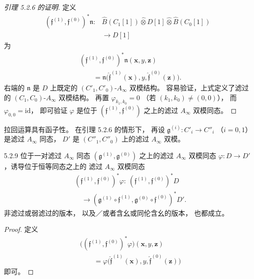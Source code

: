\begin{proof}[引理 5.2.6 的证明]
定义
\[
\begin{aligned}
(\mathfrak f^{(1)},\mathfrak f^{(0)})^*\mathfrak n:
&\widehat B(C_1[1])\widehat\otimes D[1]
 \widehat\otimes\widehat B(C_0[1])\\
&\longrightarrow D[1]
\end{aligned}
\]
为
\[
\begin{aligned}
&(\mathfrak f^{(1)},\mathfrak f^{(0)})^*
\mathfrak n(\mathbf x,y,\mathbf z)\\
&\qquad=
\mathfrak n\bigl(
\widehat{\mathfrak f}^{(1)}(\mathbf x),
y,\widehat{\mathfrak f}^{(0)}(\mathbf z)
\bigr).
\end{aligned}
\]
右端的 $\mathfrak n$ 是 $D$ 上既定的
$(C'_1,C'_0)$-$A_\infty$ 双模结构。
容易验证，上式定义了滤过的
$(C_1,C_0)$-$A_\infty$ 双模结构。
再置 $\varphi_{k_1,k_0}=0$
（若 $(k_1,k_0)\ne(0,0)$），
而 $\varphi_{0,0}=\mathrm{id}$，
即可验证 $\varphi$ 是位于
$(\mathfrak f^{(1)},\mathfrak f^{(0)})$
之上的滤过 $A_\infty$ 双模同态。
\end{proof}

拉回运算具有函子性。
在引理 5.2.6 的情形下，
再设 $\mathfrak g^{(i)}:C'_i\to C''_i$
（$i=0,1$）是滤过 $A_\infty$ 同态，
$D'$ 是 $(C''_1,C''_0)$ 上的滤过 $A_\infty$ 双模。

\begin{lemma}{5.2.9}\label{lem:5-2-9}
位于一对滤过 $A_\infty$ 同态
$(\mathfrak g^{(1)},\mathfrak g^{(0)})$
之上的滤过 $A_\infty$ 双模同态
$\varphi:D\to D'$，诱导位于恒等同态之上的
滤过 $A_\infty$ 双模同态
\[
\begin{aligned}
&(\mathfrak f^{(1)},\mathfrak f^{(0)})^*\varphi:\
(\mathfrak f^{(1)},\mathfrak f^{(0)})^*D\\
&\quad\longrightarrow
(\mathfrak g^{(1)}\circ\mathfrak f^{(1)},
 \mathfrak g^{(0)}\circ\mathfrak f^{(0)})^*D'.
\end{aligned}
\]
非滤过或弱滤过的版本，
以及／或者含幺或同伦含幺的版本，
也都成立。
\end{lemma}

\begin{proof}
定义
\[
\begin{aligned}
&\bigl((\mathfrak f^{(1)},\mathfrak f^{(0)})^*
\varphi\bigr)(\mathbf x,y,\mathbf z)\\
&\qquad=
\varphi\bigl(
\widehat{\mathfrak f}^{(1)}(\mathbf x),
y,\widehat{\mathfrak f}^{(0)}(\mathbf z)
\bigr)
\end{aligned}
\]
即可。
\end{proof}

